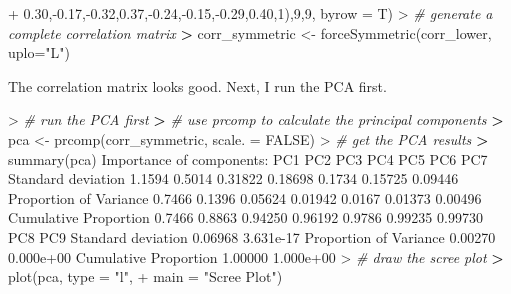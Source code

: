 \documentclass[
]{article}
\newenvironment{Shaded}{\begin{snugshade}}{\end{snugshade}}
\newcommand{\AttributeTok}[1]{\textcolor[rgb]{0.77,0.63,0.00}{#1}}
\newcommand{\CommentTok}[1]{\textcolor[rgb]{0.56,0.35,0.01}{\textit{#1}}}
\newcommand{\ConstantTok}[1]{\textcolor[rgb]{0.00,0.00,0.00}{#1}}
\newcommand{\DecValTok}[1]{\textcolor[rgb]{0.00,0.00,0.81}{#1}}
\newcommand{\ErrorTok}[1]{\textcolor[rgb]{0.64,0.00,0.00}{\textbf{#1}}}
\newcommand{\FloatTok}[1]{\textcolor[rgb]{0.00,0.00,0.81}{#1}}
\newcommand{\FunctionTok}[1]{\textcolor[rgb]{0.00,0.00,0.00}{#1}}
\newcommand{\NormalTok}[1]{#1}
\newcommand{\OtherTok}[1]{\textcolor[rgb]{0.56,0.35,0.01}{#1}}
\newcommand{\SpecialCharTok}[1]{\textcolor[rgb]{0.00,0.00,0.00}{#1}}
\newcommand{\StringTok}[1]{\textcolor[rgb]{0.31,0.60,0.02}{#1}}
\begin{document}
\begin{Shaded}
\begin{Highlighting}[]
\SpecialCharTok{+}                       \FloatTok{0.30}\NormalTok{,}\SpecialCharTok{{-}}\FloatTok{0.17}\NormalTok{,}\SpecialCharTok{{-}}\FloatTok{0.32}\NormalTok{,}\FloatTok{0.37}\NormalTok{,}\SpecialCharTok{{-}}\FloatTok{0.24}\NormalTok{,}\SpecialCharTok{{-}}\FloatTok{0.15}\NormalTok{,}\SpecialCharTok{{-}}\FloatTok{0.29}\NormalTok{,}\FloatTok{0.40}\NormalTok{,}\DecValTok{1}\NormalTok{),}\DecValTok{9}\NormalTok{,}\DecValTok{9}\NormalTok{, }\AttributeTok{byrow =}\NormalTok{ T)}
\SpecialCharTok{\textgreater{}} \CommentTok{\# generate a complete correlation matrix}
\ErrorTok{\textgreater{}}\NormalTok{ corr\_symmetric }\OtherTok{\textless{}{-}} \FunctionTok{forceSymmetric}\NormalTok{(corr\_lower, }\AttributeTok{uplo=}\StringTok{"L"}\NormalTok{)}
\end{Highlighting}
\end{Shaded}

The correlation matrix looks good. Next, I run the PCA first.

\begin{Shaded}
\begin{Highlighting}[]
\SpecialCharTok{\textgreater{}} \CommentTok{\# run the PCA first}
\ErrorTok{\textgreater{}} \CommentTok{\# use prcomp to calculate the principal components}
\ErrorTok{\textgreater{}}\NormalTok{ pca }\OtherTok{\textless{}{-}} \FunctionTok{prcomp}\NormalTok{(corr\_symmetric, }\AttributeTok{scale. =} \ConstantTok{FALSE}\NormalTok{)}
\SpecialCharTok{\textgreater{}} \CommentTok{\# get the PCA results}
\ErrorTok{\textgreater{}} \FunctionTok{summary}\NormalTok{(pca)}
\NormalTok{Importance of components}\SpecialCharTok{:}
\NormalTok{                          PC1    PC2     PC3     PC4    PC5     PC6     PC7}
\NormalTok{Standard deviation     }\FloatTok{1.1594} \FloatTok{0.5014} \FloatTok{0.31822} \FloatTok{0.18698} \FloatTok{0.1734} \FloatTok{0.15725} \FloatTok{0.09446}
\NormalTok{Proportion of Variance }\FloatTok{0.7466} \FloatTok{0.1396} \FloatTok{0.05624} \FloatTok{0.01942} \FloatTok{0.0167} \FloatTok{0.01373} \FloatTok{0.00496}
\NormalTok{Cumulative Proportion  }\FloatTok{0.7466} \FloatTok{0.8863} \FloatTok{0.94250} \FloatTok{0.96192} \FloatTok{0.9786} \FloatTok{0.99235} \FloatTok{0.99730}
\NormalTok{                           PC8       PC9}
\NormalTok{Standard deviation     }\FloatTok{0.06968} \FloatTok{3.631e{-}17}
\NormalTok{Proportion of Variance }\FloatTok{0.00270} \FloatTok{0.000e+00}
\NormalTok{Cumulative Proportion  }\FloatTok{1.00000} \FloatTok{1.000e+00}
\SpecialCharTok{\textgreater{}} \CommentTok{\# draw the scree plot }
\ErrorTok{\textgreater{}} \FunctionTok{plot}\NormalTok{(pca, }\AttributeTok{type =} \StringTok{"l"}\NormalTok{, }
\SpecialCharTok{+}      \AttributeTok{main =} \StringTok{"Scree Plot"}\NormalTok{)}
\end{Highlighting}
\end{Shaded}
\end{document}
